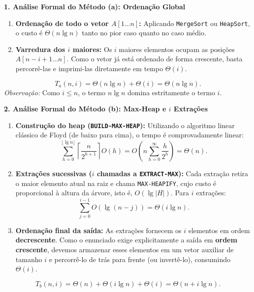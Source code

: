 \documentclass[11pt,a4paper]{article}
\newcommand{\topico}[1]{\par\medskip\textbf{\color{azul}#1}\par}
\begin{document}
\topico{1. Análise Formal do Método (a): Ordenação Global}
\begin{enumerate}
    \item \textbf{Ordenação de todo o vetor $A[1 \dots n]$:} Aplicando \texttt{MergeSort} ou \texttt{HeapSort}, o custo é $\Theta(n \lg n)$ tanto no pior caso quanto no caso médio.
    \item \textbf{Varredura dos $i$ maiores:} Os $i$ maiores elementos ocupam as posições $A[n - i + 1 \dots n]$. Como o vetor já está ordenado de forma crescente, basta percorrê-las e imprimi-las diretamente em tempo $\Theta(i)$.
\end{enumerate}
\[
T_a(n, i) = \Theta(n \lg n) + \Theta(i) = \Theta(n \lg n).
\]
\textit{Observação:} Como $i \le n$, o termo $n \lg n$ domina estritamente o termo $i$.

\topico{2. Análise Formal do Método (b): Max-Heap e $i$ Extrações}
\begin{enumerate}
    \item \textbf{Construção do heap (\texttt{BUILD-MAX-HEAP}):} Utilizando o algoritmo linear clássico de Floyd (de baixo para cima), o tempo é comprovadamente linear:
    \[
    \sum_{h=0}^{\lfloor \lg n \rfloor} \left\lceil \frac{n}{2^{h+1}} \right\rceil O(h) = O\left(n \sum_{h=0}^\infty \frac{h}{2^h}\right) = \Theta(n).
    \]
    \item \textbf{Extrações sucessivas ($i$ chamadas a \texttt{EXTRACT-MAX}):}
    Cada extração retira o maior elemento atual na raiz e chama \texttt{MAX-HEAPIFY}, cujo custo é proporcional à altura da árvore, isto é, $O(\lg |H|)$. Para $i$ extrações:
    \[
    \sum_{j=0}^{i-1} O(\lg(n - j)) = \Theta(i \lg n).
    \]
    \item \textbf{Ordenação final da saída:} As extrações fornecem os $i$ elementos em ordem \textbf{decrescente}. Como o enunciado exige explicitamente a saída em \textbf{ordem crescente}, devemos armazenar esses elementos em um vetor auxiliar de tamanho $i$ e percorrê-lo de trás para frente (ou invertê-lo), consumindo $\Theta(i)$.
\end{enumerate}
\[
T_b(n, i) = \Theta(n) + \Theta(i \lg n) + \Theta(i) = \Theta(n + i \lg n).
\]
\end{document}
